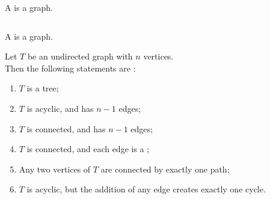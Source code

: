 
\begin{frame}{}
  \begin{definition}[Tree (树)]
    A  is a    graph.
  \end{definition}

  \pause
  \begin{columns}
  \end{columns}

  \pause
  \vspace{0.30cm}

  \pause
  \begin{definition}[Forest (森林)]
    A  is a   graph.
  \end{definition}
\end{frame}

\begin{frame}{}
\end{frame}

\begin{frame}{}
  \begin{theorem}
    Let $T$ be an undirected graph with $n$ vertices. \\[3pt]
    Then the following statements are :
    \begin{enumerate}[(1)]
      \setlength{\itemsep}{6pt}
      \item $T$ is a tree;
      \item $T$ is acyclic, and has $n-1$ edges;
      \item $T$ is connected, and has $n-1$ edges;
      \item $T$ is connected, and each edge is a ;
      \item Any two vertices of $T$ are connected by exactly one path;
      \item $T$ is acyclic, but the addition of any edge creates exactly one cycle.
    \end{enumerate}
  \end{theorem}
\end{frame}

